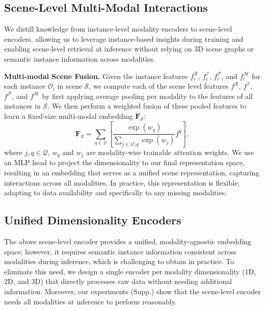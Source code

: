 \subsection{Scene-Level Multi-Modal Interactions}
\label{sec:scene_encoder_training}
We distill knowledge from instance-level modality encoders to scene-level encoders, allowing us to leverage instance-based insights during training and enabling scene-level retrieval at inference without relying on 3D scene graphs or semantic instance information across modalities.

\noindent \textbf{Multi-modal Scene Fusion.} Given the instance features $f_i^\mathcal{R}$, $f_i^\mathcal{I}$, $f_i^\mathcal{P}$, and $f_i^\mathcal{M}$ for each instance $\mathcal{O}_i$ in scene $\mathcal{S}$, we compute each of the scene level features $f^\mathcal{R}$, $f^\mathcal{I}$, $f^\mathcal{P}$, and $f^\mathcal{M}$ by first applying average pooling per modality to the features of all instances in $\mathcal{S}$. We then perform a weighted fusion of these pooled features to learn a fixed-size multi-modal embedding $\mathbf{F}_\mathcal{S}$:
%
\begin{equation}
\mathbf{F}_{\mathcal{S}} = \sum_{q \in \mathcal{Q}} \left[ \frac{\exp(w_q)}{\sum_{j \in \mathcal{Q} \setminus q} \exp(w_j)} f^q \right],
\end{equation}
%
where  $j, q \in \mathcal{Q}$, $w_q$ and $w_j$ are modality-wise trainable attention weights. We use an MLP head to project the dimensionality to our final representation space, resulting in an embedding that serves as a unified scene representation, capturing interactions across all modalities. In practice, this representation is flexible, adapting to data availability and specifically to any missing modalities.


\subsection{Unified Dimensionality Encoders}
\label{sec:unified_encoder_training}

The above scene-level encoder provides a unified, modality-agnostic embedding space; however, it requires semantic instance information consistent across modalities during inference, which is challenging to obtain in practice. To eliminate this need, we design a single encoder per modality dimensionality (\ie 1D, 2D, and 3D) that directly processes raw data without needing additional information. Moreover,
our experiments (Supp.) show that the scene-level encoder
needs all modalities at inference to perform reasonably. 

